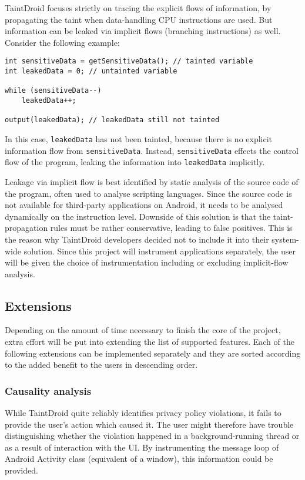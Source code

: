 \documentclass[12pt]{article}
\begin{document}
TaintDroid focuses strictly on tracing the explicit flows of information, 
by propagating the taint when data-handling CPU instructions are used. 
But information can be leaked via implicit flows (branching instructions) 
as well. Consider the following example:

\begin{verbatim}
int sensitiveData = getSensitiveData(); // tainted variable
int leakedData = 0; // untainted variable

while (sensitiveData--)
    leakedData++;

output(leakedData); // leakedData still not tainted
\end{verbatim}

In this case, \verb|leakedData| has not been tainted, because there is 
no explicit information flow from \verb|sensitiveData|. Instead, 
\verb|sensitiveData| effects the control flow of the program, leaking
the information into \verb|leakedData| implicitly. 

Leakage via implicit flow is best identified by static analysis of the 
source code of the program, often used to analyse scripting languages. 
Since the source code is not available for third-party applications on 
Android, it needs to be analysed dynamically on the instruction level.
Downside of this solution is that the taint-propagation rules must be
rather conservative, leading to false positives. This is the reason why
TaintDroid developers decided not to include it into their system-wide
solution. Since this project will instrument applications separately, 
the user will be given the choice of instrumentation including or 
excluding implicit-flow analysis.

\subsection*{Extensions}

Depending on the amount of time necessary to finish the core of the project,
extra effort will be put into extending the list of supported features. Each 
of the following extensions can be implemented separately and they are 
sorted according to the added benefit to the users in descending order.

\subsubsection*{Causality analysis}

While TaintDroid quite reliably identifies privacy policy violations,
it fails to provide the user's action which caused it. The user 
might therefore have trouble distinguishing whether the violation 
happened in a background-running thread or as a result of interaction
with the UI. By instrumenting the message loop of Android Activity class
(equivalent of a window), this information could be provided.
\end{document}
